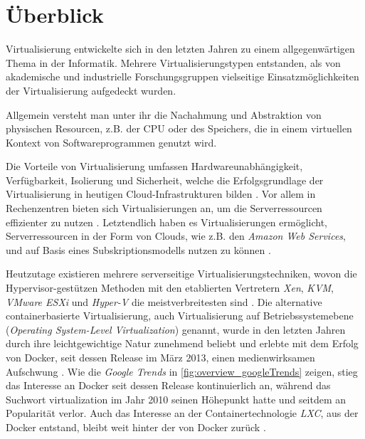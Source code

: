 \documentclass[../main.tex]{subfiles}
\begin{document}
\chapter{Überblick}
\label{overview}
  Virtualisierung entwickelte sich in den letzten Jahren zu einem allgegenwärtigen Thema in der Informatik. Mehrere Virtualisierungstypen entstanden, als von akademische und industrielle Forschungsgruppen vielseitige Einsatzmöglichkeiten der Virtualisierung aufgedeckt wurden.

  Allgemein versteht man unter ihr die Nachahmung und Abstraktion von physischen Resourcen, z.B. der \acrshort{CPU} oder des Speichers, die in einem virtuellen Kontext von Softwareprogrammen genutzt wird.

  Die Vorteile von Virtualisierung umfassen Hardwareunabhängigkeit, Verfügbarkeit, Isolierung und Sicherheit, welche die Erfolgsgrundlage der Virtualisierung in heutigen \gls{Cloud}-Infrastrukturen bilden \cite[S.1]{containerVirtPerformance}. Vor allem in Rechenzentren bieten sich Virtualisierungen an, um die Serverressourcen effizienter zu nutzen \cite[S.1]{dockerSec1}. Letztendlich haben es Virtualisierungen ermöglicht, Serverressourcen in der Form von \glspl{Cloud}, wie z.B. den \emph{Amazon Web Services}\cite{amazonWebServices}, und auf Basis eines Subskriptionsmodells nutzen zu können \cite[S.1]{dockerSec1}.

  Heutzutage existieren mehrere serverseitige Virtualisierungstechniken, wovon die Hypervisor-gestützen Methoden mit den etablierten Vertretern \emph{Xen}\cite{xen}, \emph{KVM}\cite{kvm}, \emph{VMware ESXi}\cite{vmwareESXi} und \emph{Hyper-V}\cite{hyperv} die meistverbreitesten sind \cite[S.2]{containerVirtPerformance}. Die alternative containerbasierte Virtualisierung, auch Virtualisierung auf Betriebssystemebene (\emph{Operating System-Level Virtualization}) genannt, wurde in den letzten Jahren durch ihre leichtgewichtige Natur zunehmend beliebt und erlebte mit dem Erfolg von Docker, seit dessen Release im März 2013, einen medienwirksamen Aufschwung \cite{githubDockerChangelog}. Wie die \emph{Google Trends} in \fig \ref{fig:overview_googleTrends} zeigen, stieg das Interesse an Docker seit dessen Release kontinuierlich an, während das Suchwort \glqq{}virtualization\grqq{} im Jahr 2010 seinen Höhepunkt hatte und seitdem an Popularität verlor. Auch das Interesse an der Containertechnologie \emph{LXC}, aus der Docker entstand, bleibt weit hinter der von Docker zurück \cite{googleTrends}.
\end{document}
